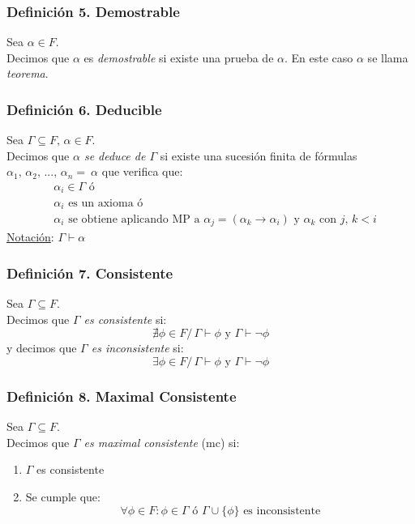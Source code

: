 \documentclass{article}
\newcommand{\comma}{,\,}                                %
\newcommand{\tq}{/\,}                                   %
\begin{document}
\subsubsection*{Definición 5. Demostrable}
Sea $\alpha \in F$.
\\Decimos que $\alpha$ es \emph{demostrable} si existe una prueba de $\alpha$. En este caso $\alpha$ se llama \emph{teorema}.

\subsubsection*{Definición 6. Deducible}
Sea $\Gamma \subseteq F \comma \alpha \in F$.
\\Decimos que \emph{$\alpha$ se deduce de $\Gamma$} si existe una sucesión finita de fórmulas  $\alpha_1\comma \alpha_2 \comma ... \comma \alpha_n =~\alpha$ que verifica que:
\begin{align*}
    &\alpha_i \in \Gamma \text{ ó}\\
    &\alpha_i \text{ es un axioma ó}\\
    &\alpha_i \text{ se obtiene aplicando MP a } \alpha_j = (\alpha_k \rightarrow \alpha_i) \text{ y } \alpha_k \text{ con } j \comma k < i
\end{align*}
\underline{Notación}: $\Gamma \vdash \alpha$

\subsubsection*{Definición 7. Consistente}
Sea $\Gamma \subseteq F$.
\\Decimos que \emph{$\Gamma$ es consistente} si:
\begin{equation*}
    \nexists \phi \in F \tq \Gamma \vdash \phi \text{ y } \Gamma \vdash \neg \phi
\end{equation*}
y decimos que \emph{$\Gamma$ es inconsistente} si:
\begin{equation*}
    \exists \phi \in F \tq \Gamma \vdash \phi \text{ y } \Gamma \vdash \neg \phi
\end{equation*}

\subsubsection*{Definición 8. Maximal Consistente}
Sea $\Gamma \subseteq F$.
\\Decimos que \emph{$\Gamma$ es maximal consistente} (mc) si:
\begin{enumerate}
    \item $\Gamma$ es consistente
    \item Se cumple que:
    \begin{equation*}
        \forall \phi \in F : \phi \in \Gamma \text{ ó } \Gamma \cup \{\phi\} \text{ es inconsistente}
    \end{equation*}
\end{enumerate}
\end{document}

